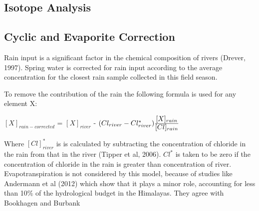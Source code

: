 
\subsection{Isotope Analysis}

\subsection{Cyclic and Evaporite Correction}

Rain input is a significant factor in the chemical composition of rivers (Drever, 1997).
Spring water is corrected for rain input according to the average concentration for the closest 
rain sample collected in this field season. %

\bsk

To remove the contribution of the rain the following formula is used for any element X:

\begin{center}
{\Large
$[X]_{rain-corrected}$  = $[X]_{river}$ - $(Cl_{river} - Cl^*_{river})\ddfrac{[X]_{rain}}{[Cl]_{rain}}$}

\end{center}

Where $[Cl]^*_{river}$ is is calculated by subtracting the concentration of chloride in the rain from that in the river (Tipper et al, 2006).
$Cl^{*}$ is taken to be zero if the concentration of chloride in the rain is greater than concentration of river. Evapotranspiration is not considered by this model, because of
studies like Andermann et al (2012) which show that it plays a minor role, accounting for less than 10\% of the hydrological budget in the Himalayas.
They agree with Bookhagen and Burbank



\bsk
\bsk



